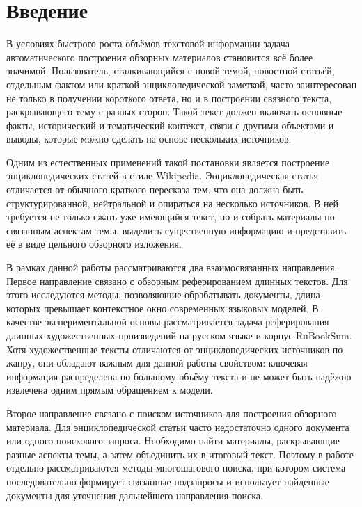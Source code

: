 \documentclass[oneside,senior,etd]{BYUPhys}
\begin{document}
\fixmargins
\makepreliminarypages

\oneandhalfspace

\tableofcontents
\clearpage

\section*{Введение}

В условиях быстрого роста объёмов текстовой информации задача автоматического построения обзорных материалов становится всё более значимой. 
Пользователь, сталкивающийся с новой темой, новостной статьёй, отдельным фактом или краткой энциклопедической заметкой, часто заинтересован не только в получении короткого ответа, 
но и в построении связного текста, раскрывающего тему с разных сторон. 
Такой текст должен включать основные факты, исторический и тематический контекст, связи с другими объектами и выводы, которые можно сделать на основе нескольких источников.

Одним из естественных применений такой постановки является построение энциклопедических статей в стиле Wikipedia. 
Энциклопедическая статья отличается от обычного краткого пересказа тем, что она должна быть структурированной, нейтральной и опираться на несколько источников. 
В ней требуется не только сжать уже имеющийся текст, но и собрать материалы по связанным аспектам темы, выделить существенную информацию и представить её в виде цельного обзорного изложения.

В рамках данной работы рассматриваются два взаимосвязанных направления. 
Первое направление связано с обзорным реферированием длинных текстов. 
Для этого исследуются методы, позволяющие обрабатывать документы, длина которых превышает контекстное окно современных языковых моделей. 
В качестве экспериментальной основы рассматривается задача реферирования длинных художественных произведений на русском языке и корпус RuBookSum. 
Хотя художественные тексты отличаются от энциклопедических источников по жанру, они обладают важным для данной работы свойством: ключевая информация распределена по большому объёму текста и не может быть надёжно извлечена одним прямым обращением к модели.

Второе направление связано с поиском источников для построения обзорного материала. 
Для энциклопедической статьи часто недостаточно одного документа или одного поискового запроса. 
Необходимо найти материалы, раскрывающие разные аспекты темы, а затем объединить их в итоговый текст. 
Поэтому в работе отдельно рассматриваются методы многошагового поиска, при котором система последовательно формирует связанные подзапросы и использует найденные документы для уточнения дальнейшего направления поиска.
\end{document}
